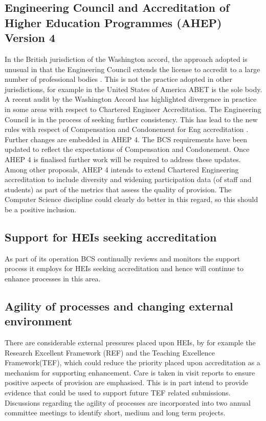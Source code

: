 \documentclass[sigconf]{acmart}
\begin{document}
\subsection {Engineering Council and Accreditation of Higher Education Programmes (AHEP) Version 4}
In the British jurisdiction of the Washington accord, the approach adopted is unusual in that the Engineering Council extends the license to accredit to a large number of professional bodies \cite{EC2019}. This is not the practice adopted in other jurisdictions, for example in the United States of America ABET is the sole body. A recent audit by the Washington Accord has highlighted divergence in practice in some areas with respect to Chartered Engineer Accreditation. The Engineering Council is in the process of seeking further consistency. This has lead to the new rules with respect of Compensation and Condonement for Eng accreditation \cite{EC2018}. Further changes are embedded in AHEP 4. The BCS requirements have been updated to reflect the expectations of Compensation and Condonement. Once AHEP 4 is finalised further work will be required to address these updates. Among other proposals, AHEP 4 intends to extend Chartered Engineering accreditation to include diversity and widening participation data (of staff and students) as part of the metrics that assess the quality of provision. The Computer Science discipline could clearly do better in this regard, so this should be a positive inclusion.

\subsection{Support for HEIs seeking accreditation}
As part of its operation BCS continually reviews and monitors the support process it employs for HEIs seeking accreditation and hence will continue to enhance processes in this area.

\subsection{Agility of processes and changing external environment}
There are considerable external pressures placed upon HEIs, by for example the Research Excellent Framework (REF) and the Teaching Excellence Framework(TEF), which could reduce the priority placed upon accreditation as a mechanism for supporting enhancement. Care is taken in visit reports to ensure positive aspects of provision are emphasised. This is in part intend to provide evidence that could be used to support future TEF related submissions. Discussions regarding the agility of processes are incorporated into two annual committee meetings to identify short, medium and long term projects. 
\end{document}
